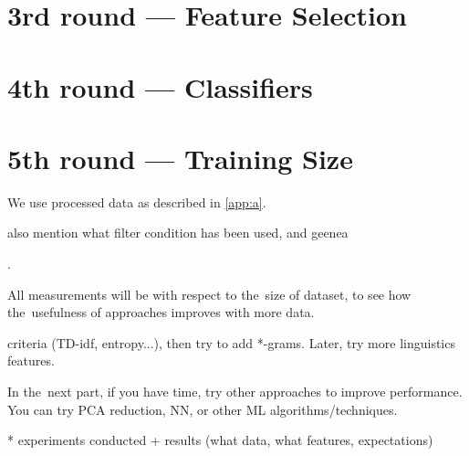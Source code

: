 \section{3rd round --- Feature Selection}

\section{4th round --- Classifiers}

\section{5th round --- Training Size}

We use processed data as described in \autoref{app:a}.

also mention what filter condition has been used, and geenea


\label{chap:exp}

.

All measurements will be with respect to the~size of dataset, to see how the~usefulness of approaches improves with more data.

criteria (TD-idf, entropy...), then try to add *-grams. Later, try more linguistics features.

In the~next part, if you have time, try other approaches to improve performance. You can try PCA reduction, NN, or other ML algorithms/techniques.

* experiments conducted + results (what data, what features, expectations)


